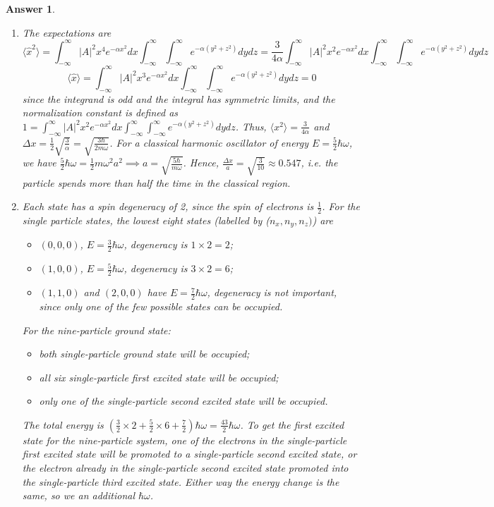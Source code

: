 \documentclass[a4paper]{article}
\newtheorem{ans}{Answer}[subsection]
\theoremstyle{new}
\begin{document}
\begin{ans}
\begin{enumerate}[label=(\alph*)]
\item The expectations are
$$\langle\hat{x}^2\rangle=\int_{-\infty}^\infty|A|^2x^4e^{-\alpha x^2}dx\int_{-\infty}^\infty\int_{-\infty}^\infty e^{-\alpha(y^2+z^2)}dydz=\frac{3}{4\alpha}\int_{-\infty}^\infty |A|^2x^2e^{-\alpha x^2}dx\int_{-\infty}^\infty\int_{-\infty}^\infty e^{-\alpha(y^2+z^2)}dydz$$
$$\langle\hat{x}\rangle=\int_{-\infty}^\infty|A|^2x^3e^{-\alpha x^2}dx\int_{-\infty}^\infty\int_{-\infty}^\infty e^{-\alpha(y^2+z^2)}dydz=0$$
since the integrand is odd and the integral has symmetric limits, and the normalization constant is defined as $1=\int_{-\infty}^\infty |A|^2x^2e^{-\alpha x^2}dx\int_{-\infty}^\infty\int_{-\infty}^\infty e^{-\alpha(y^2+z^2)}dydz$. Thus, $\langle x^2\rangle=\frac{3}{4\alpha}$ and $\Delta x=\frac{1}{2}\sqrt{\frac{3}{\alpha}}=\sqrt{\frac{3\hbar}{2m\omega}}$. For a classical harmonic oscillator of energy $E=\frac{5}{2}\hbar\omega$, we have $\frac{5}{2}\hbar\omega=\frac{1}{2}m\omega^2a^2\implies a=\sqrt{\frac{5\hbar}{m\omega}}$. Hence, $\frac{\Delta x}{a}=\sqrt{\frac{3}{10}}\approx 0.547$, i.e. the particle spends more than half the time in the classical region.
\item Each state has a spin degeneracy of 2, since the spin of electrons is $\frac{1}{2}$. For the single particle states, the lowest eight states (labelled by ($n_x,n_y,n_z)$) are
\begin{itemize}
    \item $(0,0,0)$, $E=\frac{3}{2}\hbar\omega$, degeneracy is $1\times2=2$;
    \item $(1,0,0)$, $E=\frac{5}{2}\hbar\omega$, degeneracy is $3\times 2=6$;
    \item $(1,1,0)$ and $(2,0,0)$ have $E=\frac{7}{2}\hbar\omega$, degeneracy is not important, since only one of the few possible states can be occupied.
\end{itemize}
For the nine-particle ground state:
\begin{itemize}
    \item both single-particle ground state will be occupied;
    \item all six single-particle first excited state will be occupied;
    \item only one of the single-particle second excited state will be occupied.
\end{itemize}
The total energy is $(\frac{3}{2}\times 2+\frac{5}{2}\times 6+\frac{7}{2})\hbar\omega=\frac{43}{2}\hbar\omega$. To get the first excited state for the nine-particle system, one of the electrons in the single-particle first excited state will be promoted to a single-particle second excited state, or the electron already in the single-particle second excited state promoted into the single-particle third excited state. Either way the energy change is the same, so we an additional $\hbar\omega$.
\end{enumerate}
\end{ans}
\newpage
\end{document}
